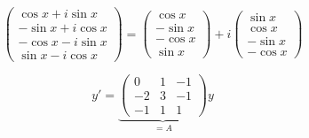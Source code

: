\documentclass[a4paper,twoside,DIV15,BCOR12mm]{scrbook}
\begin{document}
\begin{beispiele}
\[\begin{pmatrix}
\cos x + i \sin x\\
-\sin x + i \cos x \\
-\cos x - i \sin x\\
\sin x - i \cos x
\end{pmatrix} = 
\begin{pmatrix}
\cos x \\
-\sin x\\
-\cos x\\
\sin x
\end{pmatrix} + i
\begin{pmatrix}
\sin x\\
\cos x\\
-\sin x\\
-\cos x
\end{pmatrix}
\]

\item 
\[ y' = \underbrace{
\begin{pmatrix}
0&1&-1\\
-2&3&-1\\
-1&1&1
\end{pmatrix}}_{=A} y \]


\end{beispiele}
\end{document}
